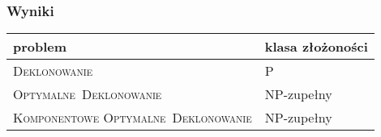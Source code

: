\documentclass{beamer}
\begin{document}
\begin{frame} \frametitle{Wyniki}


\begin{tabularx}{\textwidth}{| X | X |}\hline
	\textbf{problem} & \textbf{klasa złożoności} \\ \hline
	\textsc{Deklonowanie} & P \\ \hline
	\textsc{\mbox{Optymalne Deklonowanie}} & NP-zupełny \\ \hline
	\textsc{Komponentowe \mbox{Optymalne Deklonowanie}} & NP-zupełny \\ \hline
\end{tabularx}

\end{frame}

\frame{\titlepage}
\end{document}
